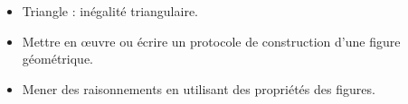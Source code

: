 \begin{prerequis}    
    \begin{itemize}        
        \item[\emoji{red-heart}] Triangle : inégalité triangulaire.
        \columnbreak
        \item[\emoji{diamond-suit}] Mettre en \oe uvre ou écrire un protocole de construction d’une figure géométrique.
        \item[\emoji{diamond-suit}]  Mener des raisonnements en utilisant des propriétés des figures.
    \end{itemize}
\end{prerequis}